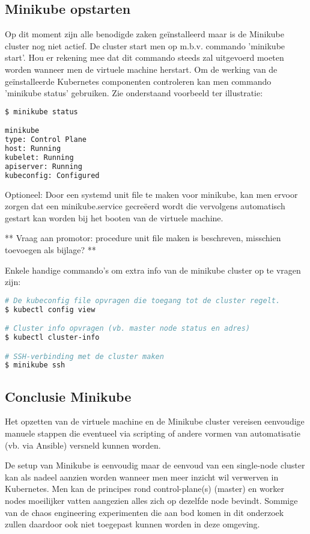 \subsection{Minikube opstarten}

Op dit moment zijn alle benodigde zaken geïnstalleerd maar is de Minikube cluster nog niet actief. De cluster start men op m.b.v. commando 'minikube start'. Hou er rekening mee dat dit commando steeds zal uitgevoerd moeten worden wanneer men de virtuele machine herstart.
Om de werking van de geïnstalleerde Kubernetes componenten controleren kan men commando 'minikube status' gebruiken. Zie onderstaand voorbeeld ter illustratie: 
\begin{lstlisting}[language=bash]
$ minikube status

minikube
type: Control Plane
host: Running
kubelet: Running
apiserver: Running
kubeconfig: Configured
\end{lstlisting} 

Optioneel: Door een systemd unit file te maken voor minikube, kan men ervoor zorgen dat een minikube.service gecreëerd wordt die vervolgens automatisch gestart kan worden bij het booten van de virtuele machine. 

** Vraag aan promotor: procedure unit file maken is beschreven, misschien toevoegen als bijlage? **

Enkele handige commando's om extra info van de minikube cluster op te vragen zijn:
\begin{lstlisting}[language=bash]
# De kubeconfig file opvragen die toegang tot de cluster regelt.
$ kubectl config view 

# Cluster info opvragen (vb. master node status en adres)
$ kubectl cluster-info

# SSH-verbinding met de cluster maken
$ minikube ssh 

\end{lstlisting}

\subsection{Conclusie Minikube}

Het opzetten van de virtuele machine en de Minikube cluster vereisen eenvoudige manuele stappen die eventueel via scripting of andere vormen van automatisatie (vb. via Ansible) versneld kunnen worden.

De setup van Minikube is eenvoudig maar de eenvoud van een single-node cluster kan als nadeel aanzien worden wanneer men meer inzicht wil verwerven in Kubernetes. Men kan de principes rond control-plane(s) (master) en worker nodes moeilijker vatten aangezien alles zich op dezelfde node bevindt. Sommige van de chaos engineering experimenten die aan bod komen in dit onderzoek zullen daardoor ook niet toegepast kunnen worden in deze omgeving.

